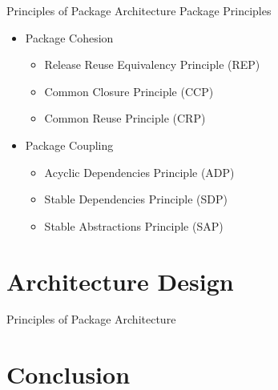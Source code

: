 \documentclass[xcolor=svgnames, handout]{beamer}
\begin{document}

\begin{frame}{Principles of Package Architecture}
    Package Principles
    \begin{itemize}
        \item<2-> Package Cohesion
            \begin{itemize}
                \item<4-> Release Reuse Equivalency Principle (REP)
                \item<5-> Common Closure Principle (CCP)
                \item<6-> Common Reuse Principle (CRP)
            \end{itemize}
        \item<3-> Package Coupling
            \begin{itemize}
                \item<7-> Acyclic Dependencies Principle (ADP)
                \item<8-> Stable Dependencies Principle (SDP)
                \item<9-> Stable Abstractions Principle (SAP)
            \end{itemize}
    \end{itemize}
\end{frame}


\begin{frame}{\subsecname}
\end{frame}


\section{Architecture Design}


\begin{frame}{Principles of Package Architecture}
\end{frame}


\section{Conclusion}
\end{document}
